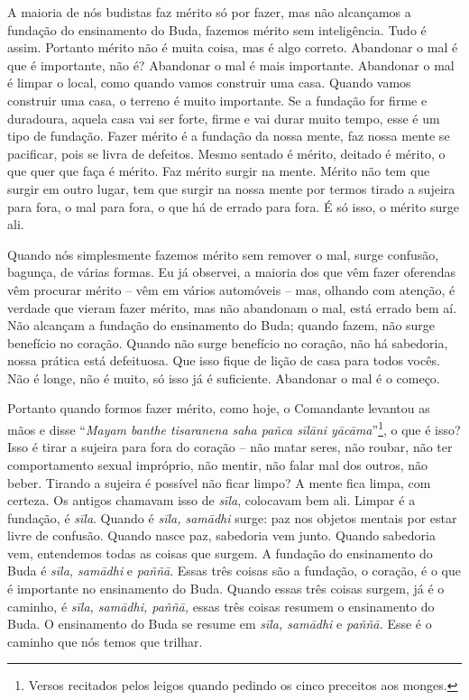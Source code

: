 A maioria de nós budistas faz mérito só por fazer, mas não
alcançamos a fundação do ensinamento do Buda, fazemos mérito sem
inteligência. Tudo é assim. Portanto mérito não é muita coisa, mas é
algo correto. Abandonar o mal é que é importante, não é? Abandonar o
mal é mais importante. Abandonar o mal é limpar o local, como quando
vamos construir uma casa. Quando vamos construir uma casa, o terreno é
muito importante. Se a fundação for firme e duradoura, aquela casa vai
ser forte, firme e vai durar muito tempo, esse é um tipo de fundação.
Fazer mérito é a fundação da nossa mente, faz nossa mente se pacificar,
pois se livra de defeitos. Mesmo sentado é mérito, deitado é mérito, o
que quer que faça é mérito. Faz mérito surgir na mente. Mérito não tem
que surgir em outro lugar, tem que surgir na nossa mente por termos
tirado a sujeira para fora, o mal para fora, o que há de errado para
fora. É só isso, o mérito surge ali. 

Quando nós simplesmente fazemos mérito sem remover o mal, surge
confusão, bagunça, de várias formas. Eu já observei, a maioria dos que
vêm fazer oferendas vêm procurar mérito – vêm em vários automóveis –
mas, olhando com atenção, é verdade que vieram fazer mérito, mas não
abandonam o mal, está errado bem aí. Não alcançam a fundação do
ensinamento do Buda; quando fazem, não surge benefício no coração.
Quando não surge benefício no coração, não há sabedoria, nossa prática
está defeituosa. Que isso fique de lição de casa para todos vocês. Não
é longe, não é muito, só isso já é suficiente. Abandonar o mal é o
começo.

Portanto quando formos fazer mérito, como hoje, o Comandante
levantou as mãos e disse “\textit{Mayam banthe tisaranena saha pañca
sīlāni yācāma}”\footnote{Versos recitados pelos leigos quando
pedindo os cinco preceitos aos monges. }, o que é isso? Isso é tirar a
sujeira para fora do coração – não matar seres, não
roubar, não ter comportamento sexual impróprio, não mentir, não falar
mal dos outros, não beber. Tirando a sujeira é possível não ficar
limpo? A mente fica limpa, com certeza. Os antigos chamavam isso de
\textit{sīla}, colocavam bem ali. Limpar é a fundação, é
\textit{sīla}. Quando é \textit{sīla, samādhi} surge: paz nos
objetos mentais por estar livre de confusão. Quando nasce paz,
sabedoria vem junto. Quando sabedoria vem, entendemos todas as coisas
que surgem. A fundação do ensinamento do Buda é \textit{sīla,
samādhi} e\textit{ paññā}. Essas três coisas são a fundação, o
coração, é o que é importante no ensinamento do Buda. Quando essas três
coisas surgem, já é o caminho, é \textit{sīla, samādhi, paññā,}
essas três coisas resumem o ensinamento do Buda. O ensinamento do Buda
se resume em \textit{sīla, samādhi} e\textit{ paññā.} Esse é o
caminho que nós temos que trilhar. 

